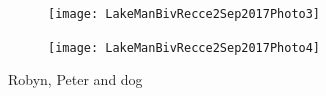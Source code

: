 \documentclass[12pt]{article} %
\begin{document}
\begin{figure}[ht]
\begin{minipage}{.5\linewidth}
\begin{flushleft}
   \texttt{[image: LakeManBivRecce2Sep2017Photo3]}
\end{flushleft}
\end{minipage}
\begin{minipage}{.5\linewidth}
\begin{flushright}
   \texttt{[image: LakeManBivRecce2Sep2017Photo4]}
\end{flushright}
\end{minipage}
\end{figure}

\begin{flushright}
Robyn, Peter and dog
\end{flushright}
\end{document}
